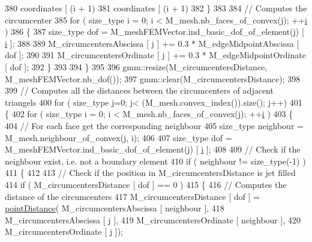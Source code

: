 \begin{DoxyCode}
380                                     coordinates [ (i + 1) %
381                                     coordinates [ (i + 1) %
382         \}
383 
384         \textcolor{comment}{// Computes the circumcenter}
385         \textcolor{keywordflow}{for} ( size\_type i = 0; i < M\_mesh.nb\_faces\_of\_convex(j); ++\hyperlink{matrici_8m_a6f6ccfcf58b31cb6412107d9d5281426}{i} )
386         \{
387             size\_type dof = M\_meshFEMVector.ind\_basic\_dof\_of\_element(j) [ \hyperlink{matrici_8m_a6f6ccfcf58b31cb6412107d9d5281426}{i} ];
388             
389             M\_circumcentersAbscissa [ j ] += 0.3 * M\_edgeMidpointAbscissa [ dof ];
390             
391             M\_circumcentersOrdinate [ j ] += 0.3 * M\_edgeMidpointOrdinate [ dof ];
392         \}
393     
394     \}
395     
396     gmm::resize(M\_circumcentersDistance, M\_meshFEMVector.nb\_dof());
397     gmm::clear(M\_circumcentersDistance);
398 
399     \textcolor{comment}{// Computes all the distances between the circumcenters of adjacent triangels}
400     \textcolor{keywordflow}{for} ( size\_type j=0; j< (M\_mesh.convex\_index()).size(); j++)
401     \{
402         \textcolor{keywordflow}{for} ( size\_type i = 0; i < M\_mesh.nb\_faces\_of\_convex(j); ++\hyperlink{matrici_8m_a6f6ccfcf58b31cb6412107d9d5281426}{i} )
403         \{
404             \textcolor{comment}{// For each face get the corresponding neighbour}
405             size\_type neighbour = M\_mesh.neighbour\_of\_convex(j, i);
406 
407             size\_type dof = M\_meshFEMVector.ind\_basic\_dof\_of\_element(j) [ \hyperlink{matrici_8m_a6f6ccfcf58b31cb6412107d9d5281426}{i} ];
408  
409             \textcolor{comment}{// Check if the neighbour exist, i.e. not a boundary element}
410             \textcolor{keywordflow}{if} ( neighbour != size\_type(-1) )
411             \{
412 
413                 \textcolor{comment}{// Check if the position in M\_circumcentersDistance is jet filled}
414                 \textcolor{keywordflow}{if} ( M\_circumcentersDistance [ dof ] == 0 )
415                 \{
416                     \textcolor{comment}{// Computes the distance of the circumcenters}
417                     M\_circumcentersDistance [ dof ] = \hyperlink{UsefulFunctions_8h_ad9cf8f3fe42287349e8e1b2f1f824958}{pointDistance}( M\_circumcentersAbscissa [
       neighbour ],
418                                                                      M\_circumcentersAbscissa [ j ],
419                                                                      M\_circumcentersOrdinate [ neighbour ],
420                                                                      M\_circumcentersOrdinate [ j ]);

\end{DoxyCode}
